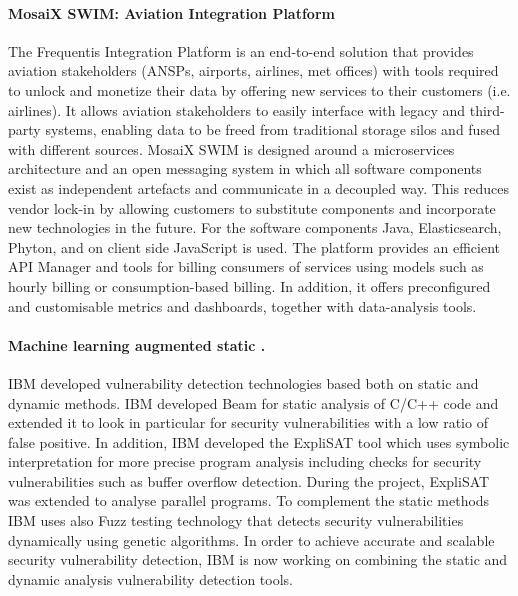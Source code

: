 \documentclass[a4paper,11pt]{article}
\begin{document}
\paragraph{\FRQshort{} MosaiX SWIM: Aviation Integration Platform}
\label{sec:swim}
The Frequentis Integration Platform is an end-to-end solution that provides aviation stakeholders (ANSPs, airports, airlines, met offices) with tools required to unlock and monetize their data by offering new services to their customers (i.e. airlines). It allows aviation stakeholders to easily interface with legacy and third-party systems, enabling data to be freed from traditional storage silos and fused with different sources. MosaiX SWIM is designed around a microservices architecture and an open messaging system in which all software components exist as independent artefacts and communicate in a decoupled way. This reduces vendor lock-in by allowing customers to substitute components and incorporate new technologies in the future. For the software components  Java, Elasticsearch, Phyton, and on client side JavaScript is used. The platform provides an efficient API Manager and tools for billing consumers of services using models such as hourly billing or consumption-based billing. In addition, it offers preconfigured and customisable metrics and dashboards, together with data-analysis tools.



\paragraph{\YAGshort{} Machine learning augmented static .}

IBM developed vulnerability detection technologies based both on static and dynamic methods. IBM developed Beam for static analysis of C/C++ code and extended it to look in particular for security vulnerabilities with a low ratio of false positive. In addition, IBM developed the ExpliSAT tool which uses symbolic interpretation for more precise program analysis including checks for security vulnerabilities such as buffer overflow detection. During the \rephrase{} project, ExpliSAT was extended to analyse parallel programs. To complement the static methods IBM uses also Fuzz testing technology that detects security vulnerabilities dynamically using genetic algorithms. In order to achieve accurate and scalable security vulnerability detection, IBM is now working on combining the static and dynamic analysis vulnerability detection tools.     
\end{document}
